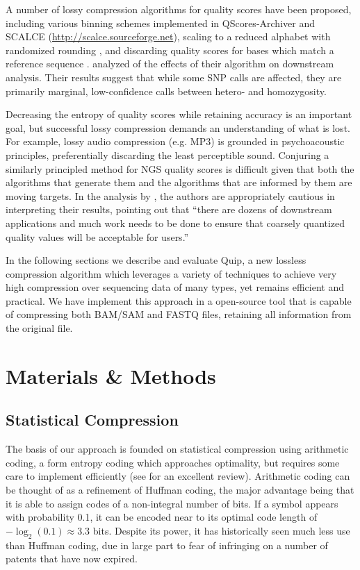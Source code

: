 \documentclass[a4,center,fleqn]{NAR}
\begin{document}
A number of lossy compression algorithms for quality scores have been
proposed, including various binning schemes implemented in QScores-Archiver
\citep{Wan2011} and SCALCE (\url{http://scalce.sourceforge.net}), scaling to a
reduced alphabet with randomized rounding \citep{Kozanitis2011}, and
discarding quality scores for bases which match a reference sequence \citep
{Hsi-YangFritz2011}. \citet{Kozanitis2011} analyzed of the effects of their
algorithm on downstream analysis. Their results suggest that while some SNP
calls are affected, they are primarily marginal, low-confidence calls between
hetero- and homozygosity.

Decreasing the entropy of quality scores while retaining accuracy is an
important goal, but successful lossy compression demands an understanding of
what is lost. For example, lossy audio compression (e.g. MP3) is grounded in
psychoacoustic principles, preferentially discarding the least perceptible
sound. Conjuring a similarly principled method for NGS quality scores is
difficult given that both the algorithms that generate them and the algorithms
that are informed by them are moving targets. In the analysis by
\citet{Kozanitis2011}, the authors are appropriately cautious in interpreting
their results, pointing out that ``there are dozens of downstream applications
and much work needs to be done to ensure that coarsely quantized quality
values will be acceptable for users.''



In the following sections we describe and evaluate Quip, a new lossless
compression algorithm which leverages a variety of techniques to achieve very
high compression over sequencing data of many types, yet remains efficient and
practical. We have implement this approach in a open-source tool that is
capable of compressing both BAM/SAM and FASTQ files, retaining all information
from the original file.


\section{Materials \& Methods}

\subsection{Statistical Compression}

The basis of our approach is founded on statistical compression using
arithmetic coding, a form entropy coding which approaches optimality, but
requires some care to implement efficiently (see \citet{Said2004} for an
excellent review). Arithmetic coding can be thought of as a refinement of
Huffman coding, the major advantage being that it is able to assign codes of a
non-integral number of bits. If a symbol appears with probability 0.1, it can
be encoded near to its optimal code length of $-\log_2(0.1) \approx 3.3$ bits.
Despite its power, it has historically seen much less use than Huffman coding,
due in large part to fear of infringing on a number of patents that have now
expired.
\end{document}
